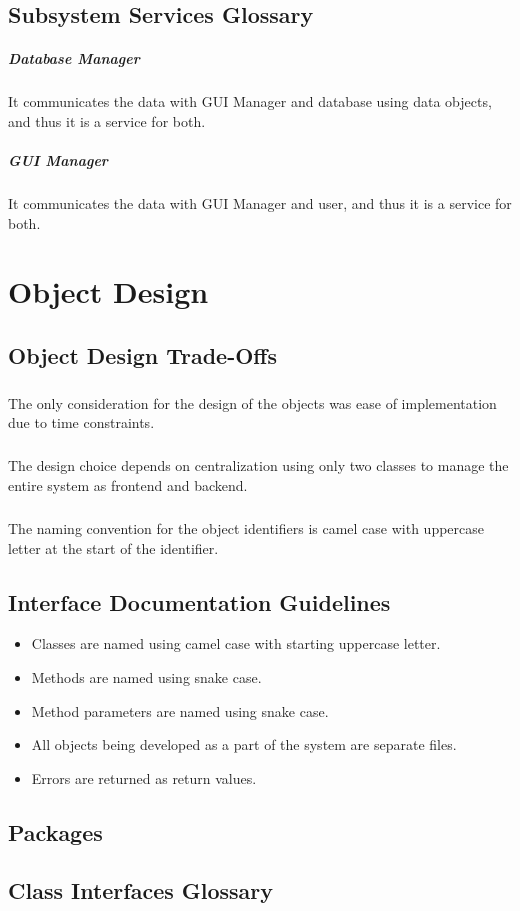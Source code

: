 \documentclass[a4paper,12pt]{report}
\begin{document}
		\section{Subsystem Services Glossary}
			\paragraph{Database Manager} It communicates the data with GUI Manager and database using data objects, and thus it is a service for both.
			\paragraph{GUI Manager} It communicates the data with GUI Manager and user, and thus it is a service for both.
	\chapter{Object Design}
		\section{Object Design Trade-Offs}
			\paragraph{} The only consideration for the design of the objects was ease of implementation due to time constraints.
			\paragraph{} The design choice depends on centralization using only two classes to manage the entire system as frontend and backend.
			\paragraph{} The naming convention for the object identifiers is camel case with uppercase letter at the start of the identifier.
		\section{Interface Documentation Guidelines}
			\begin{itemize}
				\item Classes are named using camel case with starting uppercase letter.
				\item Methods are named using snake case.
				\item Method parameters are named using snake case.
				\item All objects being developed as a part of the system are separate files.
				\item Errors are returned as return values.
			\end{itemize}
		\section{Packages}
		\section{Class Interfaces Glossary}
\end{document}
